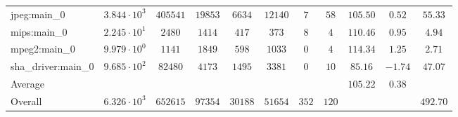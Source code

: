 \begin{tabular}{|l|c|c|c|c|c|c|c|c|c|c|}
jpeg:main\_0            & $ 3.844 \cdot 10^{3}  $ & $ 405541 $ & $ 19853 $ & $ 6634  $ & $ 12140 $ & $ 7   $ & $ 58  $ & $ 105.50      $ & $ 0.52    $ & $ 55.33   $ \\
mips:main\_0            & $ 2.245 \cdot 10^{1}  $ & $ 2480   $ & $ 1414  $ & $ 417   $ & $ 373   $ & $ 8   $ & $ 4   $ & $ 110.46      $ & $ 0.95    $ & $ 4.94    $ \\
mpeg2:main\_0           & $ 9.979 \cdot 10^{0}  $ & $ 1141   $ & $ 1849  $ & $ 598   $ & $ 1033  $ & $ 0   $ & $ 4   $ & $ 114.34      $ & $ 1.25    $ & $ 2.71    $ \\
sha\_driver:main\_0     & $ 9.685 \cdot 10^{2}  $ & $ 82480  $ & $ 4173  $ & $ 1495  $ & $ 3381  $ & $ 0   $ & $ 10  $ & $ 85.16       $ & $ -1.74   $ & $ 47.07   $ \\
\hline
Average                 & $                     $ & $        $ & $       $ & $       $ & $       $ & $     $ & $     $ & $ 105.22      $ & $ 0.38    $ & $         $ \\
\hline
Overall                 & $ 6.326 \cdot 10^{3}  $ & $ 652615 $ & $ 97354 $ & $ 30188 $ & $ 51654 $ & $ 352 $ & $ 120 $ & $             $ & $         $ & $ 492.70  $ \\
\hline
\end{tabular}
